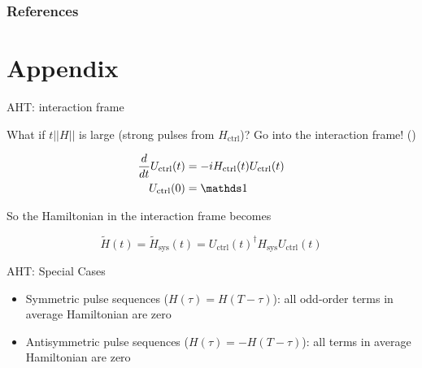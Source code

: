 \documentclass{beamer}
\begin{document}
\begin{frame}[allowframebreaks]
\frametitle{References}

\printbibliography

\end{frame}

























\section{Appendix}



\begin{frame}{AHT: interaction frame}

What if $t||H||$ is large (strong pulses from $H_{\text{ctrl}}$)? Go into the interaction frame! (\cite{brinkmann_2016})

\begin{align*}
    \frac{d}{dt} U_{\text{ctrl}}(t) &=
        -i H_{\text{ctrl}}(t)U_{\text{ctrl}}(t) \\
    U_{\text{ctrl}}(0) &= \identity
\end{align*}

So the Hamiltonian in the interaction frame becomes

\[
    \widetilde{H}(t) = \widetilde{H}_{\text{sys}}(t) = U_{\text{ctrl}}(t)^\dagger H_{\text{sys}} U_{\text{ctrl}}(t)
\]

\end{frame}

\begin{frame}{AHT: Special Cases}

\begin{itemize}

\item
  Symmetric pulse sequences (\(H(\tau) = H(T - \tau)\)): all odd-order
  terms in average Hamiltonian are zero
\item
  Antisymmetric pulse sequences (\(H(\tau) = - H(T - \tau)\)): all
  terms in average Hamiltonian are zero
\end{itemize}
\end{frame}
\end{document}
